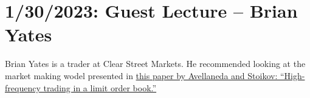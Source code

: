 \chapter{1/30/2023: Guest Lecture -- Brian Yates}
Brian Yates is a trader at Clear Street Markets. He recommended looking at the market making wodel presented in \href{https://www.math.nyu.edu/~avellane/HighFrequencyTrading.pdf}{this paper by Avellaneda and Stoikov: ``High-frequency trading in a limit order book.''}


